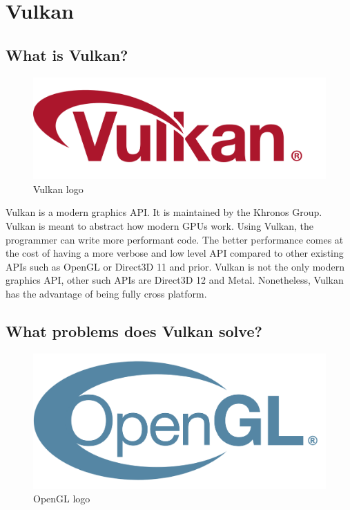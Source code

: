 \chapter{Vulkan}

\section{What is Vulkan?}

\begin{figure}
    \begin{center}
        \includegraphics[scale=0.10]{images/ChVulkan/VulkanLogo.png}
    \end{center}
    \caption{Vulkan logo}
    \label{fig:VulkanLogo}
\end{figure}

Vulkan is a modern graphics API. It is maintained by the Khronos Group.
Vulkan is meant to abstract how modern GPUs work.
Using Vulkan, the programmer can write more performant code.
The better performance comes at the cost of having a more verbose and low level API compared to
other existing APIs such as OpenGL or Direct3D 11 and prior.
Vulkan is not the only modern graphics API, other such APIs are Direct3D 12 and Metal.
Nonetheless, Vulkan has the advantage of being fully cross platform.

\section{What problems does Vulkan solve?}

\begin{figure}
    \begin{center}
        \includegraphics[scale=0.10]{images/ChVulkan/OpenGLLogo.png}
    \end{center}
    \caption{OpenGL logo}
    \label{fig:OpenGLLogo}
\end{figure}

